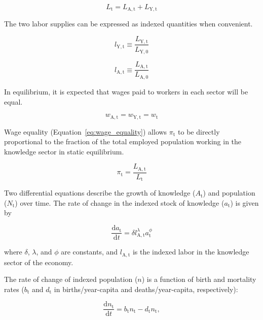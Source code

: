 \documentclass[letterpaper,12pt]{article}
\begin{document}
\begin{equation} \label{eq:labor_supply}
	L_\mathrm{t} = L_\mathrm{A,t} + L_\mathrm{Y,t}
\end{equation}

The two labor supplies can be expressed as indexed quantities when convenient.

\begin{equation}
	l_\mathrm{Y,t} \equiv \frac{L_\mathrm{Y,t}}{L_\mathrm{Y,0}}
\end{equation}

\begin{equation}
	l_\mathrm{A,t} \equiv \frac{L_\mathrm{A,t}}{L_\mathrm{A,0}}
\end{equation}

In equilibrium, it is expected that wages paid to workers in each sector will be equal.

\begin{equation} \label{eq:wage_equality}
	w_\mathrm{A,t} = w_\mathrm{Y,t} = w_\mathrm{t}
\end{equation}

Wage equality (Equation~\ref{eq:wage_equality}) allows $\pi_\mathrm{t}$ to be directly proportional to the fraction of the total employed population working in the knowledge sector in static equilibrium.

\begin{equation} \label{eq:pi}
	\pi_\mathrm{t} = \frac{L_\mathrm{A,t}}{L_\mathrm{t}}
\end{equation}

Two differential equations describe the growth of knowledge ($A_\mathrm{t}$) and population ($N_\mathrm{t}$) over time. The rate of change in the indexed stock of knowledge ($a_\mathrm{t}$) is given by

\begin{equation} \label{eq:da_dt}
	\frac{\mathrm{d}a_\mathrm{t}}{\mathrm{d}t} = \delta l_\mathrm{A,t}^\lambda a_\mathrm{t}^\phi
\end{equation}

\noindent where $\delta$, $\lambda$, and $\phi$ are constants, and $l_\mathrm{A,t}$ is the indexed labor in the knowledge sector of the economy.

The rate of change of indexed population ($n$) is a function of birth and mortality rates ($b_\mathrm{t}$ and $d_\mathrm{t}$ in births/year-capita and deaths/year-capita, respectively):

\begin{equation} \label{eq:dn_dt}
	\frac{\mathrm{d}n_\mathrm{t}}{\mathrm{d}t} = b_\mathrm{t} n_\mathrm{t} - d_\mathrm{t} n_\mathrm{t},
\end{equation}
\end{document}
